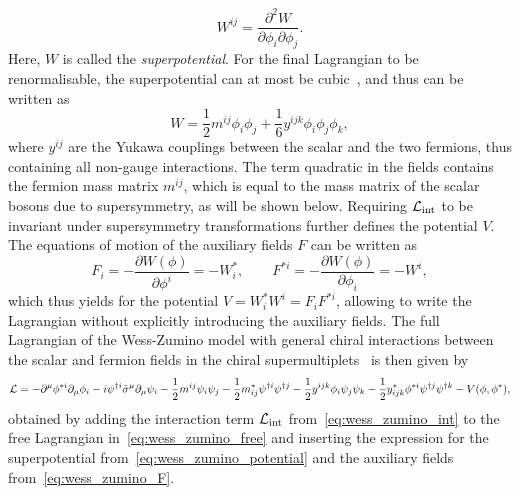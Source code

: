 \begin{equation}
	W^{ij} = \frac{\partial^2 W}{\partial\phi_i\partial\phi_j}. 
\end{equation}
Here, $W$ is called the \textit{superpotential}. For the final Lagrangian to be renormalisable, the superpotential can at most be cubic~\cite{Bustamante:2009us}, and thus can be written as
\begin{equation}
	W = \frac{1}{2}m^{ij}\phi_i \phi_j + \frac{1}{6}y^{ijk}\phi_i \phi_j \phi_k,
	\label{eq:wess_zumino_potential}
\end{equation}
where $y^{ij}$ are the Yukawa couplings between the scalar and the two fermions, thus containing all non-gauge interactions. The term quadratic in the fields contains the fermion mass matrix $m^{ij}$, which is equal to the mass matrix of the scalar bosons due to supersymmetry, as will be shown below. Requiring $\mathcal{L}_\mathrm{int}$ to be invariant under supersymmetry transformations further defines the potential $V$. The equations of motion of the auxiliary fields $F$ can be written as
\begin{equation}
	F_i = -\frac{\partial W(\phi)}{\partial \phi^i} = - W^*_i, \qquad F^{*i} = - \frac{\partial W(\phi)}{\partial \phi_i} = - W^i,
	\label{eq:wess_zumino_F}
\end{equation} 
which thus yields for the potential $V = W^*_iW^i = F_iF^{*i}$, allowing to write the Lagrangian without explicitly introducing the auxiliary fields. The full Lagrangian of the Wess-Zumino model with general chiral interactions between the scalar and fermion fields in the chiral supermultiplets~\cite{Bustamante:2009us} is then given by
\begin{equation}
	\mathcal{L} = -\partial^\mu\phi^{*i}\partial_\mu\phi_i - i\psi^{\dagger i}\bar{\sigma}^\mu\partial_\mu\psi_i - \frac{1}{2} m^{ij}\psi_i \psi_j - \frac{1}{2} m_{ij}^* \psi^{\dagger i} \psi^{\dagger j} - \frac{1}{2} y^{ijk} \phi_i \psi_j \psi_k - \frac{1}{2} y^*_{ijk} \phi^{*i} \psi^{\dagger j} \psi^{\dagger k} - V(\phi,\phi^*),
	\label{eq:wess_zumino_lagrangian}
\end{equation}
obtained by adding the interaction term $\mathcal{L}_\mathrm{int}$ from~\cref{eq:wess_zumino_int} to the free Lagrangian in~\cref{eq:wess_zumino_free} and inserting the expression for the superpotential from~\cref{eq:wess_zumino_potential} and the auxiliary fields from~\cref{eq:wess_zumino_F}.


